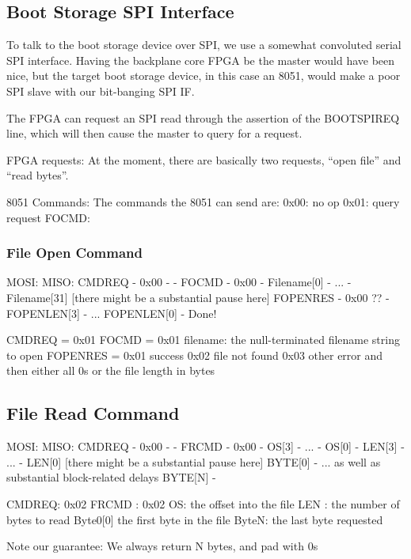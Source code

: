 \subsection{Boot Storage SPI Interface}

To talk to the boot storage device over SPI, we use a somewhat
convoluted serial SPI interface. Having the backplane core FPGA be the
master would have been nice, but the target boot storage device, in this
case an 8051, would make a poor SPI slave with our bit-banging SPI IF. 

The FPGA can request an SPI read through the assertion of the
BOOTSPIREQ line, which will then cause the master to query for a
request.

FPGA requests: At the moment, there are basically two requests, ``open
file'' and ``read bytes''.

8051 Commands: The commands the 8051 can send are: 
0x00: no op
0x01: query request
FOCMD: 
\subsubsection{File Open Command}
MOSI:          MISO:
CMDREQ          - 
 0x00           -
  -            FOCMD
  -            0x00
  -            Filename[0]
  -             ...
  -            Filename[31]
     [there might be a substantial pause here]
FOPENRES         -
0x00 ??            -
FOPENLEN[3]      -
...
FOPENLEN[0]      - 
Done!


CMDREQ = 0x01
FOCMD  = 0x01
filename: the null-terminated filename string to open
FOPENRES = 0x01 success
           0x02 file not found
           0x03 other error
and then either all 0s or the file length in bytes


\subsection{File Read Command}
MOSI:           MISO:
CMDREQ            -
0x00              - 
  -             FRCMD
  -             0x00
  -              OS[3]
  -              ...
  -              OS[0]
  -             LEN[3]
  -             ... 
  -             LEN[0]
   [there might be a substantial pause here]
BYTE[0]           -
 ...              as well as substantial block-related delays
BYTE[N]           - 
  
CMDREQ: 0x02
FRCMD : 0x02
OS: the offset into the file
LEN : the number of bytes to read
Byte0[0] the first byte in the file
ByteN: the last byte requested

Note our guarantee: We always return N bytes, and pad with 0s



